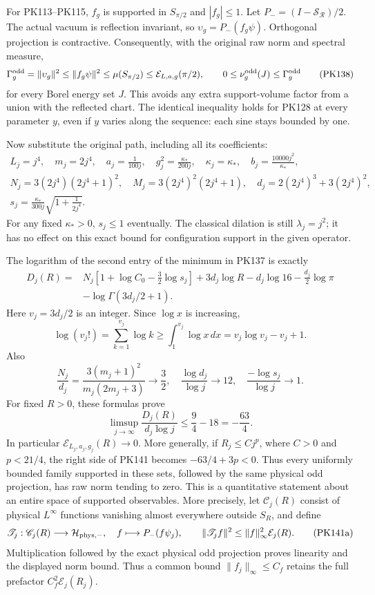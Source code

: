 \documentclass[11pt]{article}
\begin{document}
For PK113–PK115, \(f_g\) is supported in \(S_{\pi/2}\) and
\(|f_g|\le1\). Let \(P_-=(I-\mathscr S_{\mathcal R})/2\).
The actual vacuum is reflection invariant, so
\(\upsilon_g=P_-(f_g\psi)\). Orthogonal projection is contractive.
Consequently, with the original raw norm and spectral measure,
\[
 \Gamma_g^{\rm odd}=\|\upsilon_g\|^2
 \le\|f_g\psi\|^2\le\mu(S_{\pi/2})
 \le\mathcal E_{L,a,g}(\pi/2),\qquad
 0\le\nu_g^{\rm odd}(J)\le\Gamma_g^{\rm odd}
 \tag{PK138}
\]
for every Borel energy set \(J\). This avoids any extra support-volume
factor from a union with the reflected chart.
The identical inequality holds for PK128 at every parameter \(y\),
even if \(y\) varies along the sequence: each sine stays bounded by one.

Now substitute the original path, including all its coefficients:
\[
 \begin{gathered}
 L_j=j^4,\quad m_j=2j^4,\quad a_j=\frac1{100j},\quad
 g_j^2=\frac{\kappa_*}{200j},\quad
 \kappa_j=\kappa_*,\quad b_j=\frac{10000j^2}{\kappa_*},\\
 N_j=3(2j^4)(2j^4+1)^2,\quad
 M_j=3(2j^4)^2(2j^4+1),\quad
 d_j=2(2j^4)^3+3(2j^4)^2,\\
 s_j=\frac{\kappa_*}{300j}\sqrt{1+\frac1{2j^4}}.
 \end{gathered}\tag{PK139}
\]
For any fixed \(\kappa_*>0\), \(s_j\le1\) eventually.
The classical dilation is still \(\lambda_j=j^2\); it has no effect
on this exact bound for configuration support in the given operator.

The logarithm of the second entry of the minimum in PK137 is exactly
\[
 \begin{split}
 D_j(R)={}&N_j[1+\log C_0-\tfrac32\log s_j]
       +3d_j\log R-d_j\log16-\tfrac{d_j}2\log\pi\\
       &-\log\Gamma(3d_j/2+1).
 \end{split}\tag{PK140}
\]
Here \(v_j=3d_j/2\) is an integer. Since \(\log x\) is increasing,
\[
 \log(v_j!)=\sum_{k=1}^{v_j}\log k
 \ge\int_1^{v_j}\log x\,dx=v_j\log v_j-v_j+1.
\]
Also
\[
 \frac{N_j}{d_j}=\frac{3(m_j+1)^2}{m_j(2m_j+3)}
       \longrightarrow\frac32,\quad
 \frac{\log d_j}{\log j}\longrightarrow12,\quad
 \frac{-\log s_j}{\log j}\longrightarrow1.
\]
For fixed \(R>0\), these formulas prove
\[
 \limsup_{j\to\infty}\frac{D_j(R)}{d_j\log j}
 \le\frac94-18=-\frac{63}{4}.
 \tag{PK141}
\]
In particular \(\mathcal E_{L_j,a_j,g_j}(R)\to0\).
More generally, if \(R_j\le Cj^p\), where \(C>0\) and
\(p<21/4\), the right side of PK141 becomes
\(-63/4+3p<0\). Thus every uniformly bounded family supported
in these sets, followed by the same physical odd projection, has raw
norm tending to zero. This is a quantitative statement about an entire
space of supported observables. More precisely, let
\(\mathscr C_j(R)\) consist of physical \(L^\infty\) functions
vanishing almost everywhere outside \(S_R\), and define
\[
 \mathscr T_j:\mathscr C_j(R)\longrightarrow\mathcal H_{{\rm phys},-},
 \quad f\longmapsto P_-(f\psi_j),\qquad
 \|\mathscr T_jf\|^2\le\|f\|_\infty^2\mathcal E_j(R).
 \tag{PK141a}
\]
Multiplication followed by the exact physical odd projection proves
linearity and the displayed norm bound. Thus a common bound
\(\|f_j\|_\infty\le C_f\) retains the full prefactor
\(C_f^2\mathcal E_j(R_j)\).
\end{document}
